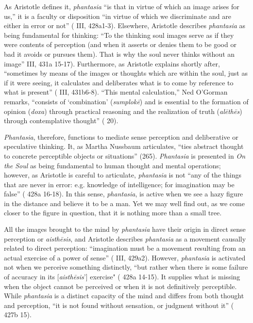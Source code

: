 \documentclass{article}
\begin{document}
 As Aristotle defines it, \textit{phantasia} ``is that in virtue of which an image arises for us,'' it is a faculty or disposition  ``in virtue of which we discriminate and are either in error or not'' (\cite{aristotle2014soul} III, 428a1-3). Elsewhere, Aristotle describes \textit{phantasia} as being fundamental for thinking: ``To the thinking soul images serve as if they were contents of perception (and when it asserts or denies them to be good or bad it avoids or pursues them). That is why the soul never thinks without an image'' \cite{aristotle2014soul} III, 431a 15-17). Furthermore, as Aristotle explains shortly after, ``sometimes by means of the images or thoughts which are within the soul, just as if it were seeing, it calculates and deliberates what is to come by reference to what is present'' (\cite{aristotle2014soul} III, 431b6-8). ``This mental calculation,'' Ned O'Gorman remarks, ``consists of `combination' (\textit{sumplokē}) and is essential to the formation of opinion (\textit{doxa}) through practical reasoning and the realization of truth (\textit{alēthēs}) through contemplative thought'' (\cite{ogorman_aristotles_phantasia} 20). 

\textit{Phantasia}, therefore, functions to mediate sense perception and deliberative or speculative thinking. It, as Martha Nussbaum articulates, “ties abstract thought to concrete perceptible objects or situations” (265). \textit{Phantasia} is presented in \textit{On the Soul} as being fundamental to human thought and mental operations; however, as Aristotle is careful to articulate, \textit{phantasia} is not ``any of the things that are never in error: e.g. knowledge of intelligence; for imagination may be false'' (\cite{aristotle2014soul} 428a 16-18). In this sense, \textit{phantasia}, is active when we see a hazy figure in the distance and believe it to be a man. Yet we may well find out, as we come closer to the figure in question, that it is nothing more than a small tree. 

All the images brought to the mind by \textit{phantasia} have their origin in direct sense perception or \textit{aisthēsis}, and Aristotle describes \textit{phantasia} as a movement causally related to direct perception: ``imagination must be a movement resulting from an actual exercise of a power of sense'' (\cite{aristotle2014soul} III, 429a2). However, \textit{phantasia} is activated not when we perceive something distinctly, ``but rather when there is some failure of accuracy in its [\textit{aisthēsis}'] exercise" (\cite{aristotle2014soul} 428a 14-15). It supplies what is missing when the object cannot be perceived or when it is not definitively perceptible. While \textit{phantasia} is a distinct capacity of the mind and differs from both thought and perception, ``it is not found without sensation, or judgment without it'' (\cite{aristotle2014soul} 427b 15). 
\end{document}
